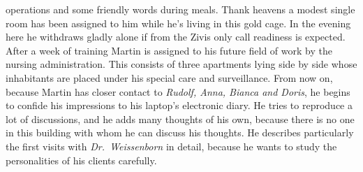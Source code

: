 operations and some friendly words during meals. 
Thank heavens a modest single room has been assigned to him while he's living in 
this gold cage. 
In the evening here he withdraws gladly alone if from the Zivis only call readiness 
is expected. \\ 
\[\] 
After a week of training Martin is assigned to his future field of work by the 
nursing administration. 
This consists of three apartments lying side by side whose inhabitants are placed 
under his special care and surveillance.
From now on, because Martin has closer contact to {\em Rudolf, Anna, Bianca and 
Doris\/}, he begins to confide his impressions to his laptop's electronic diary. 
He tries to reproduce a lot of discussions, and he adds many thoughts of his own, 
because there is no one in this building with whom he can discuss his thoughts. 
He describes particularly the first visits with {\em Dr.~Weissenborn\/} 
in detail, because he wants to study the personalities of his clients carefully.


